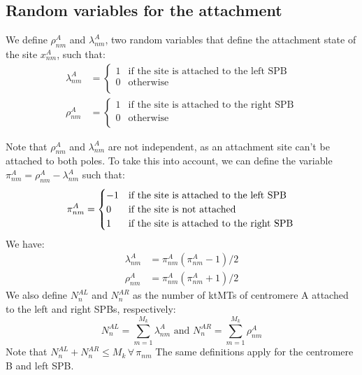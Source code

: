 \documentclass[a4paper,12pt]{article}
\renewcommand{\leq}{\leqslant}
\begin{document}
\subsection{Random variables for the attachment}

We define $\rho_{nm}^A$ and $\lambda_{nm}^A$, two random variables that define
the attachment state of the site $x_{nm}^A$, such that:
\begin{align}
  \label{eq:rholambda}
  \lambda_{nm}^A &=
  \begin{cases}
    1 &\text{if the site is attached to the left SPB}\\
    0 &\text{otherwise}\\
  \end{cases}\\
  \rho_{nm}^A &=
  \begin{cases}
    1 &\text{if the site is attached to the right SPB}\\
    0 &\text{otherwise}\\
  \end{cases}
\end{align}

Note that $\rho_{nm}^A$ and $\lambda_{nm}^A$ are not independent, as
an attachment site can't be attached to both poles. To take this into
account, we can define the variable $\pi_{nm}^A = \rho_{nm}^A -
\lambda_{nm}^A$ such that:
\begin{equation}
  \label{eq:pnm}
  \pi_{nm}^A =
  \begin{cases}
    - 1 &\text{if the site is attached to the left SPB}\\
    0 &\text{if the site is not attached}\\
    1 &\text{if the site is attached to the right SPB}\\
  \end{cases}\\
\end{equation}
We have:
\begin{align}
  \lambda_{nm}^A &= \pi_{nm}^A\left(\pi_{nm}^A - 1\right)/2\\
  \rho_{nm}^A &= \pi_{nm}^A\left(\pi_{nm}^A + 1\right)/2
\end{align}
We also define $N_n^{AL}$ and $N_n^{AR}$ as the number of ktMTs of
centromere A attached to the left and right SPBs, respectively:
\begin{equation}
  \label{eq:NAL}
  N_n^{AL} = \sum_{m = 1}^{M_k}\lambda_{nm}^A \mbox{ and }%
  N_n^{AR} = \sum_{m = 1}^{M_k}\rho_{nm}^A
\end{equation}
Note that $N_n^{AL} + N_n^{AR} \leq M_k\, \forall\, \pi_{nm} $
The same definitions apply for the centromere B and left SPB.
\end{document}
